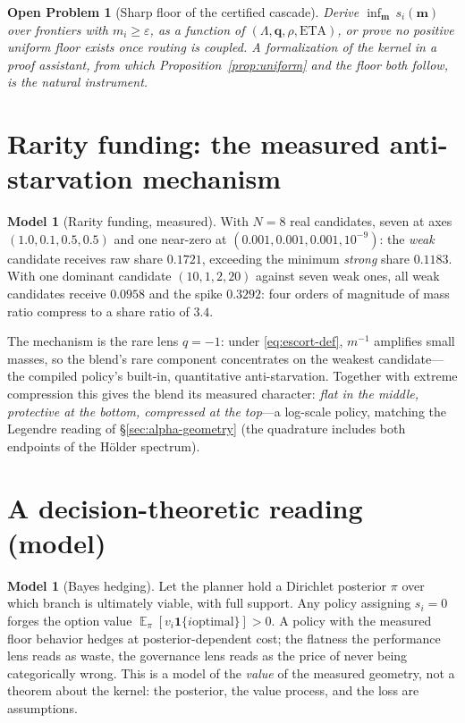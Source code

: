 \documentclass[12pt,oneside]{report}
\theoremstyle{plain}
\newtheorem{openproblem}[theorem]{Open Problem}
\theoremstyle{definition}
\newtheorem{modelx}[theorem]{Model}
\theoremstyle{remark}
\newcommand{\E}{\operatorname*{\mathbb{E}}}
\newcommand{\mass}{\mathbf{m}}
\begin{document}
\begin{openproblem}[Sharp floor of the certified cascade]
\label{sec:open-floor}
Derive $\inf_{\mass}\, s_i(\mass)$ over frontiers with $m_i\ge\varepsilon$,
as a function of $(\Lambda,\mathbf{q},\rho,\mathrm{ETA})$, or prove no
positive uniform floor exists once routing is coupled. A formalization
of the kernel in a proof assistant, from which
Proposition~\ref{prop:uniform} and the floor both follow, is the natural
instrument.
\end{openproblem}

\section{Rarity funding: the measured anti-starvation mechanism}

\begin{modelx}[Rarity funding, measured]
With $N=8$ real candidates, seven at axes $(1.0,0.1,0.5,0.5)$ and one
near-zero at $(0.001,0.001,0.001,10^{-9})$: the \emph{weak} candidate
receives raw share $0.1721$, exceeding the minimum \emph{strong} share
$0.1183$. With one dominant candidate
$(10,1,2,20)$ against seven weak ones, all weak candidates receive
$0.0958$ and the spike $0.3292$: four orders of magnitude of mass
ratio compress to a share ratio of $3.4$.
\end{modelx}

The mechanism is the rare lens $q=-1$: under
\eqref{eq:escort-def}, $m^{-1}$ amplifies small masses, so the blend's
rare component concentrates on the weakest candidate---the compiled
policy's built-in, quantitative anti-starvation. Together with extreme
compression this gives the blend its measured character: \emph{flat in
the middle, protective at the bottom, compressed at the top}---a
log-scale policy, matching the Legendre reading of
\S\ref{sec:alpha-geometry} (the quadrature includes both endpoints of
the H\"older spectrum).

\section{A decision-theoretic reading (model)}

\begin{modelx}[Bayes hedging]
Let the planner hold a Dirichlet posterior $\pi$ over which branch is
ultimately viable, with full support. Any policy assigning $s_i=0$
forges the option value $\E_\pi[v_i\mathbf{1}\{i\text{
optimal}\}]>0$. A policy with the measured floor behavior hedges at
posterior-dependent cost; the flatness the performance lens reads as
waste, the governance lens reads as the price of never being
categorically wrong. This is a model of the \emph{value} of the
measured geometry, not a theorem about the kernel: the posterior, the
value process, and the loss are assumptions.
\end{modelx}
\end{document}
